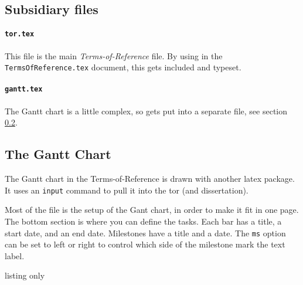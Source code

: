 \subsection{Subsidiary files}
\paragraph{\texttt{tor.tex}} This file is the main \emph{Terms-of-Reference}
file.  By using \verb'' in the  \texttt{TermsOfReference.tex} document,
this gets included and typeset.  

\paragraph{\texttt{gantt.tex}} The Gantt chart is a little complex, so gets
put into a separate file, see section \ref{gantt-chart}.

\subsection{The Gantt Chart}\label{gantt-chart}
The Gantt chart in the Terms-of-Reference is drawn with another latex package.
It uses an \texttt{input} command to pull it into the tor (and dissertation).

Most of the file  is the setup of the Gant chart, in order to
make it fit in one page.  The bottom section is where you can define the
tasks.
Each bar has a title, a start date, and an end date.  Milestones have a title
and a date.  The \texttt{ms} option can be set to left or right to control
which side of the milestone mark the text label.

\begin{tcblisting}{listing only}
 \\
 \\
 \\
%
\end{tcblisting}
